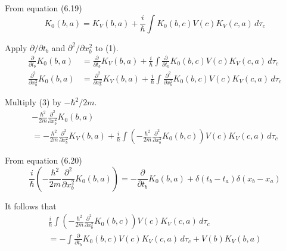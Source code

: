 


From equation (6.19)
\begin{equation*}
K_0(b,a)=K_V(b,a)+\frac{i}{\hbar}
\int K_0(b,c)V(c)K_V(c,a)\,d\tau_c
\tag{1}
\end{equation*}

Apply $\partial/\partial t_b$ and $\partial^2/\partial x_b^2$ to (1).
\begin{align*}
\frac{\partial}{\partial t_b}K_0(b,a)
&=\frac{\partial}{\partial t_b}K_V(b,a)
+\frac{i}{\hbar}\int \frac{\partial}{\partial t_b}K_0(b,c)V(c)K_V(c,a)\,d\tau_c
\tag{2}
\\
\frac{\partial^2}{\partial x_b^2}K_0(b,a)
&=\frac{\partial^2}{\partial x_b^2}K_V(b,a)
+\frac{i}{\hbar}\int \frac{\partial^2}{\partial x_b^2}K_0(b,c)V(c)K_V(c,a)\,d\tau_c
\tag{3}
\end{align*}

Multiply (3) by $-\hbar^2/2m$.
\begin{multline*}
-\frac{\hbar^2}{2m}\frac{\partial^2}{\partial x_b^2}K_0(b,a)
\\
{}=-\frac{\hbar^2}{2m}\frac{\partial^2}{\partial x_b^2}K_V(b,a)
+\frac{i}{\hbar}\int\left(-\frac{\hbar^2}{2m}\frac{\partial^2}{\partial x_b^2}K_0(b,c)\right)
V(c)K_V(c,a)\,d\tau_c
\tag{4}
\end{multline*}

From equation (6.20)
\begin{equation*}
\frac{i}{\hbar}\left(-\frac{\hbar^2}{2m}\frac{\partial^2}{\partial x_b^2}K_0(b,a)\right)
=
-\frac{\partial}{\partial t_b}K_0(b,a)
+\delta(t_b-t_a)\delta(x_b-x_a)
\end{equation*}

It follows that
\begin{multline*}
\frac{i}{\hbar}\int\left(-\frac{\hbar^2}{2m}\frac{\partial^2}{\partial x_b^2}K_0(b,c)\right)
V(c)K_V(c,a)\,d\tau_c
\\
=-\int\frac{\partial}{\partial t_b}K_0(b,c)V(c)K_V(c,a)\,d\tau_c
+V(b)K_V(b,a)
\tag{5}
\end{multline*}

